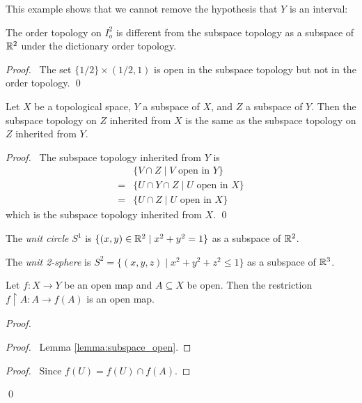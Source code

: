 This example shows that we cannot remove the hypothesis that $Y$ is an interval:

\begin{example}
    The order topology on $I_o^2$ is different from the subspace topology as a subspace of $\mathbb{R}^2$ under
    the dictionary order topology.
\end{example}

\begin{proof}
    \pf\ The set $\{ 1/2 \} \times (1/2, 1)$ is open in the subspace topology but not in the order topology.
    \qed
\end{proof}

\begin{proposition}
    Let $X$ be a topological space, $Y$ a subspace of $X$, and $Z$ a subspace of $Y$. Then the subspace
    topology on $Z$ inherited from $X$ is the same as the subspace topology on $Z$ inherited from $Y$.
\end{proposition}

\begin{proof}
    \pf\ The subspace topology inherited from $Y$ is
    \begin{align*}
        & \{ V \cap Z \mid V \text{ open in } Y \} \\
        = & \{ U \cap Y \cap Z \mid U \text{ open in } X \} \\
        = & \{ U \cap Z \mid U \text{ open in } X \}
    \end{align*}
    which is the subspace topology inherited from $X$. \qed
\end{proof}

\begin{definition}
    The \emph{unit circle} $S^1$ is $\{ (x,y) \in \mathbb{R}^2 \mid x^2 + y^2 = 1 \}$ as a subspace of $\mathbb{R}^2$.
\end{definition}

\begin{definition}
    The \emph{unit 2-sphere} is $S^2 = \{ (x,y,z) \mid x^2 + y^2 + z^2 \leq 1 \}$ as a subspace of $\mathbb{R}^3$.
\end{definition}

\begin{proposition}
    Let $f : X \rightarrow Y$ be an open map and $A \subseteq X$ be open. Then the restriction $f \restriction A : A \rightarrow f(A)$ is an open map.
\end{proposition}

\begin{proof}
    \pf
    \begin{proof}
        \pf\ Lemma \ref{lemma:subspace_open}.
    \end{proof}
    \begin{proof}
        \pf\ Since $f(U) = f(U) \cap f(A)$.
    \end{proof}
    \qed
\end{proof}

